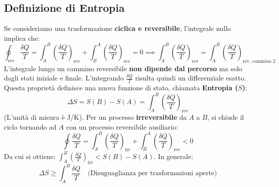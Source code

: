 \subsection{Definizione di Entropia}
Se consideriamo una trasformazione \textbf{ciclica e reversibile}, l'integrale nullo implica che:
\begin{equation*}
    \oint_{\text{rev}} \frac{\delta Q}{T} = \int_{A}^{B} \left(\frac{\delta Q}{T}\right)_{\text{rev}} + \int_{B}^{A} \left(\frac{\delta Q}{T}\right)_{\text{rev}} = 0 \implies \int_{A}^{B} \left(\frac{\delta Q}{T}\right)_{\text{rev}} = \int_{A}^{B} \left(\frac{\delta Q}{T}\right)_{\text{rev, cammino 2}}
\end{equation*}
L'integrale lungo un cammino reversibile \textbf{non dipende dal percorso} ma solo dagli stati iniziale e finale. L'integrando $\frac{\delta Q}{T}$ risulta quindi un differenziale esatto. Questa proprietà definisce una nuova funzione di stato, chiamata \textbf{Entropia ($S$)}:
\begin{equation}
    \boxed{ \Delta S = S(B) - S(A) = \int_A^B \left( \frac{\delta Q}{T} \right)_{\text{rev}} }
\end{equation}
(L'unità di misura è J/K). 
Per un processo \textbf{irreversibile} da $A$ a $B$, si chiude il ciclo tornando ad $A$ con un processo reversibile ausiliario:
\begin{equation*}
    \oint \frac{\delta Q}{T} = \int_{A}^{B} \left( \frac{\delta Q}{T} \right)_{\text{irr}} + \int_{B}^{A} \left( \frac{\delta Q}{T} \right)_{\text{rev}} < 0
\end{equation*}
Da cui si ottiene: $\int_{A}^{B} \left( \frac{\delta Q}{T} \right)_{\text{irr}} < S(B) - S(A)$. In generale:
\begin{equation}
    \boxed{ \Delta S \ge \int_{A}^{B} \frac{\delta Q}{T} } \quad \text{(Disuguaglianza per trasformazioni aperte)}
\end{equation}

